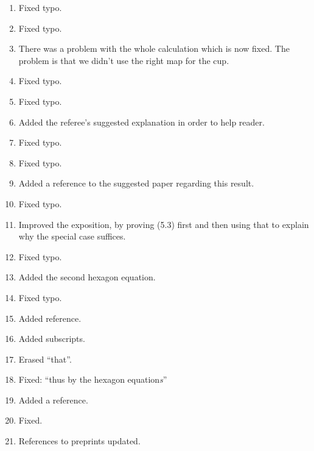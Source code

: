 \documentclass{amsart}
\begin{document}
\begin{enumerate}
\item Fixed typo.

\item Fixed typo.

\item There was a problem with the whole calculation which is now fixed. The problem is that we didn't use the right map for the cup. 

\item Fixed typo.

\item Fixed typo.

\item Added the referee's suggested explanation in order to help reader.

\item Fixed typo.

\item Fixed typo.

\item Added a reference to the suggested paper regarding this result.
\item Fixed typo.

\item Improved the exposition, by proving (5.3) first and then using that to explain why the special case suffices.

\item Fixed typo.

\item Added the second hexagon equation.

\item Fixed typo.

\item Added reference.

\item Added subscripts.

\item Erased ``that''.

\item Fixed: ``thus by the hexagon equation\emph{s}''

\item Added a reference.

\item Fixed.

\item References to preprints updated.

\end{enumerate}
\end{document}
